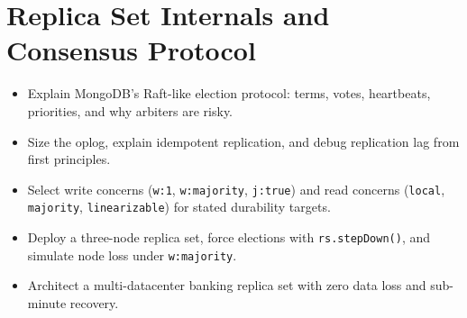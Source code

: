 \chapter{Replica Set Internals and Consensus Protocol}
%

\begin{objectives}
\begin{itemize}
    \item Explain MongoDB's Raft-like election protocol: terms, votes, heartbeats, priorities, and why arbiters are risky.
    \item Size the oplog, explain idempotent replication, and debug replication lag from first principles.
    \item Select write concerns (\texttt{w:1}, \texttt{w:majority}, \texttt{j:true}) and read concerns (\texttt{local}, \texttt{majority}, \texttt{linearizable}) for stated durability targets.
    \item Deploy a three-node replica set, force elections with \texttt{rs.stepDown()}, and simulate node loss under \texttt{w:majority}.
    \item Architect a multi-datacenter banking replica set with zero data loss and sub-minute recovery.
\end{itemize}
\end{objectives}

